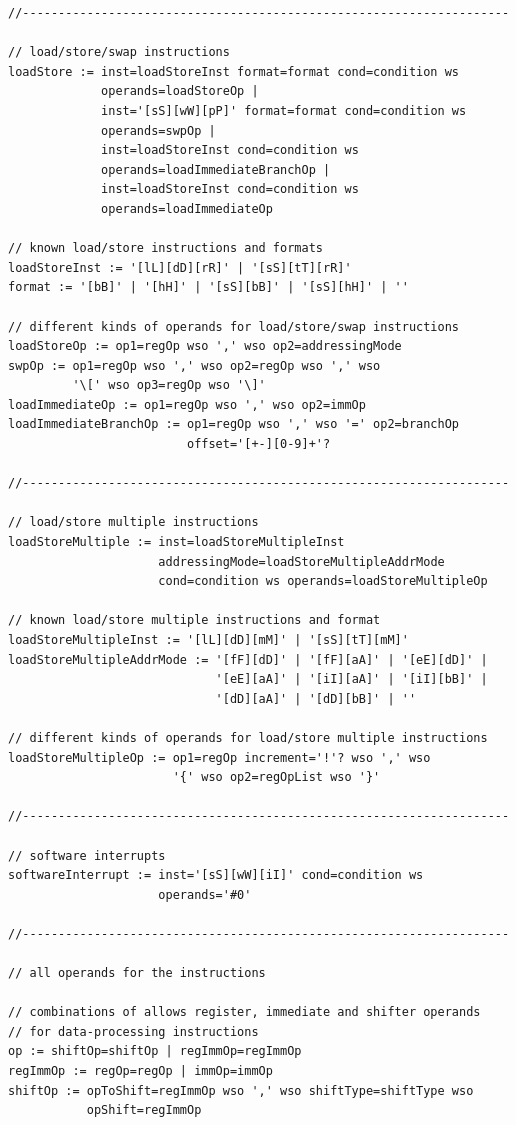\documentclass[a4paper, 11pt, onecolumn]{article}
\begin{document}
\begin{lstlisting}[basicstyle=\ttfamily\footnotesize]
//--------------------------------------------------------------------

// load/store/swap instructions
loadStore := inst=loadStoreInst format=format cond=condition ws
             operands=loadStoreOp |
             inst='[sS][wW][pP]' format=format cond=condition ws
             operands=swpOp |
             inst=loadStoreInst cond=condition ws
             operands=loadImmediateBranchOp |
             inst=loadStoreInst cond=condition ws
             operands=loadImmediateOp

// known load/store instructions and formats
loadStoreInst := '[lL][dD][rR]' | '[sS][tT][rR]'
format := '[bB]' | '[hH]' | '[sS][bB]' | '[sS][hH]' | ''

// different kinds of operands for load/store/swap instructions
loadStoreOp := op1=regOp wso ',' wso op2=addressingMode
swpOp := op1=regOp wso ',' wso op2=regOp wso ',' wso
         '\[' wso op3=regOp wso '\]'
loadImmediateOp := op1=regOp wso ',' wso op2=immOp
loadImmediateBranchOp := op1=regOp wso ',' wso '=' op2=branchOp
                         offset='[+-][0-9]+'?

//--------------------------------------------------------------------

// load/store multiple instructions
loadStoreMultiple := inst=loadStoreMultipleInst
                     addressingMode=loadStoreMultipleAddrMode
                     cond=condition ws operands=loadStoreMultipleOp

// known load/store multiple instructions and format
loadStoreMultipleInst := '[lL][dD][mM]' | '[sS][tT][mM]'
loadStoreMultipleAddrMode := '[fF][dD]' | '[fF][aA]' | '[eE][dD]' |
                             '[eE][aA]' | '[iI][aA]' | '[iI][bB]' |
                             '[dD][aA]' | '[dD][bB]' | ''

// different kinds of operands for load/store multiple instructions
loadStoreMultipleOp := op1=regOp increment='!'? wso ',' wso
                       '{' wso op2=regOpList wso '}'

//--------------------------------------------------------------------

// software interrupts
softwareInterrupt := inst='[sS][wW][iI]' cond=condition ws
                     operands='#0'

//--------------------------------------------------------------------

// all operands for the instructions

// combinations of allows register, immediate and shifter operands
// for data-processing instructions
op := shiftOp=shiftOp | regImmOp=regImmOp
regImmOp := regOp=regOp | immOp=immOp
shiftOp := opToShift=regImmOp wso ',' wso shiftType=shiftType wso
           opShift=regImmOp


\end{lstlisting}
\end{document}
